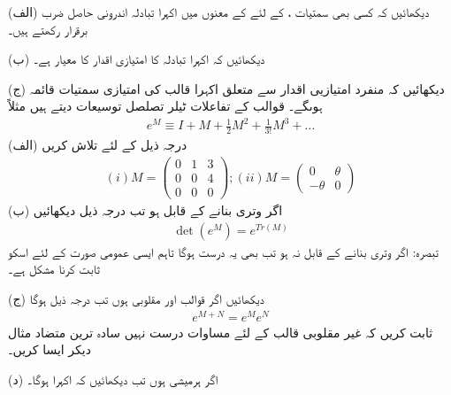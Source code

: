 (الف) دیکھائیں کہ کسی بھی سمتیات ،  کے لئے  کے معنوں میں  اکہرا تبادلہ اندرونی حاصل ضرب برقرار رکھتے ہیں۔

(ب) دیکھائیں کہ اکہرا تبادلہ کا امتیازی اقدار کا معیار  ہے۔

(ج) دیکھائیں کہ منفرد امتیازیی اقدار سے متعلق اکہرا قالب کی امتیازی سمتیات قائمہ ہوںگے۔
قوالب کے تفاعلات ٹیلر تصلصل توسیعات دیتے ہیں مثلاً 
\begin{align}
	e^M\equiv I + M +\frac{1}{2}M^2 + \frac{1}{3!}M^3 + \dots
\end{align}
(الف) درجہ ذیل کے لئے  تلاش کریں
\begin{align*}
	(i) M=
	\begin{pmatrix}
		0 & 1 & 3\\
		0 & 0 & 4\\
		0 & 0 & 0
	\end{pmatrix}
		; (ii) M=
	\begin{pmatrix}
		0 & \theta\\
		-\theta & 0
	\end{pmatrix}
\end{align*}
(ب) اگر  وتری بنانے کے قابل ہو تب درجہ ذیل دیکھائیں
\begin{align}
	\det\left(e^M\right) = e^{Tr(M)}
\end{align}
تبصرہ: اگر  وتری بنانے کے قابل نہ ہو تب بھی یہ درست ہوگا تاہم ایسی عمومی صورت کے لئے اسکو ثابت کرنا مشکل ہے۔

(ج) دیکھائیں اگر قوالب  اور  مقلوبی ہوں تب درجہ ذیل ہوگا
\begin{align}
	e^{M+N} = e^Me^N
\end{align}
ثابت کریں کہ غیر مقلوبی قالب کے لئے مساوات  درست نہیں سادہ ترین متضاد مثال دیکر ایسا کریں۔

(د) اگر  ہرمیشی ہوں تب دیکھائیں کہ اکہرا ہوگا۔
